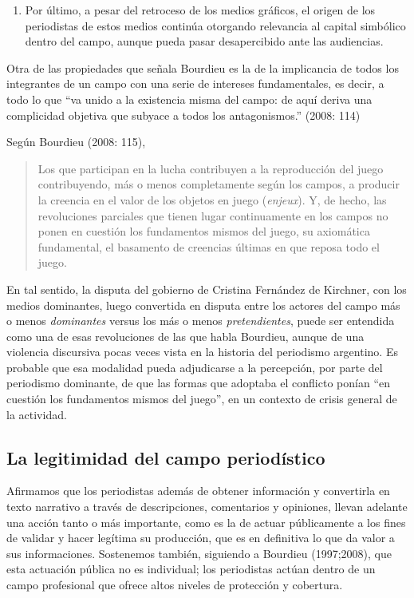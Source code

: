 \begin{enumerate} [label=\alph*.]
\item
Por último, a pesar del retroceso de los medios gráficos, el origen de los periodistas de estos medios continúa otorgando relevancia al capital simbólico dentro del campo, aunque pueda pasar desapercibido ante las audiencias.
\end{enumerate}

Otra de las propiedades que señala Bourdieu es la de la implicancia de todos los integrantes de un campo con una serie de intereses fundamentales, es decir, a todo lo que ``va unido a la existencia misma del campo: de aquí deriva una complicidad objetiva que subyace a todos los antagonismos.'' (2008: 114)

Según Bourdieu (2008: 115),

\begin{quote}
	Los que participan en la lucha contribuyen a la reproducción del juego contribuyendo, más o menos completamente según los campos, a producir la creencia en el valor de los objetos en juego (\emph{enjeux}). Y, de hecho, las revoluciones parciales que tienen lugar continuamente en los campos no ponen en cuestión los fundamentos mismos del juego, su axiomática fundamental, el basamento de creencias últimas en que reposa todo el juego.
\end{quote}


En tal sentido, la disputa del gobierno de Cristina Fernández de Kirchner, con los medios dominantes, luego convertida en disputa entre los actores del campo más o menos \emph{dominantes} versus los más o menos \emph{pretendientes}, puede ser entendida como una de esas revoluciones de las que habla Bourdieu, aunque de una violencia discursiva pocas veces vista en la historia del periodismo argentino. Es probable que esa modalidad pueda adjudicarse a la percepción, por parte del periodismo dominante, de que las formas que adoptaba el conflicto ponían ``en cuestión los fundamentos mismos del juego'', en un contexto de crisis general de la actividad.

\subsection {La legitimidad del campo periodístico}

Afirmamos que los periodistas además de obtener información y convertirla en texto narrativo a través de descripciones, comentarios y opiniones, llevan adelante una acción tanto o más importante, como es la de actuar públicamente a los fines de validar y hacer legítima su producción, que es en definitiva lo que da valor a sus informaciones. Sostenemos también, siguiendo a Bourdieu (1997;2008), que esta actuación pública no es individual; los periodistas actúan dentro de un campo profesional que ofrece altos niveles de protección y cobertura.

